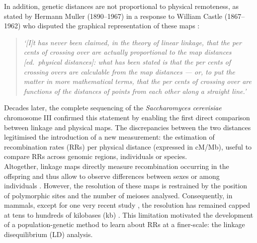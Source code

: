 In addition, genetic distances are not proportional to physical remoteness, as stated by Hermann Muller (1890--1967) \citep{muller1920are} in a response to William Castle (1867--1962) who disputed the graphical representation of these maps \citep[reviewed in \citealp{vorms2013models}]{castle1919are,castle1919arrangement}:

\begin{quote}
\textit{‘[I]t has never been claimed, in the theory of linear linkage, that the per cents of crossing over are actually proportional to the map distances [ed.\ physical distances]:  what has been stated is that the per cents of crossing overs are calculable from the map distances — or, to put the matter in more mathematical terms, that the per cents of crossing over are functions of the distances of points from each other along a straight line.’}
\end{quote}


Decades later, the complete sequencing of the \textit{Saccharomyces cerevisiae} chromosome III \citep{oliver1992complete} confirmed this statement by enabling the first direct comparison between linkage and physical maps. 
The discrepancies between the two distances legitimised the introduction of a new measurement: the estimation of recombination rates (RRs) per physical distance (expressed in cM/Mb), useful to compare RRs across genomic regions, individuals or species.\\

Altogether, linkage maps directly measure recombination occurring in the offspring and thus allow to observe differences between sexes \citep[\textit{e.g.}][]{cheung2007polymorphic,coop2008highresolution} or among individuals \citep[\textit{e.g.}][]{broman1998comprehensive}.
However, the resolution of these maps is restrained by the position of polymorphic sites and the number of meioses analysed. 
Consequently, in mammals, except for one very recent study \citep{halldorsson2019characterizing}, the resolution has remained capped at tens to hundreds of kilobases (kb) \citep{shifman2006highresolution,billings2010patterns,kong2010finescale}.
This limitation motivated the development of a population-genetic method to learn about RRs at a finer-scale: the linkage disequilibrium (LD) analysis.


